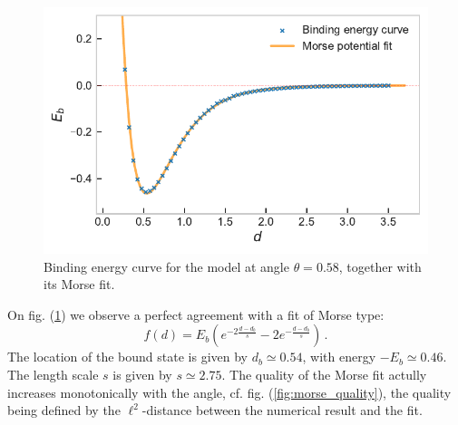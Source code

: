 \documentclass[reprint, amsmath, amssymb, aps, pra]{revtex4-2}
\begin{document}
    \begin{figure}
        \includegraphics[scale=0.74]{figures/binding.pdf}
        \caption{\label{fig:binding}Binding energy curve for the model at angle $\theta=0.58$, together with its Morse fit.}
    \end{figure}

    On fig. (\ref{fig:binding}) we observe a perfect agreement with a fit of Morse type:
    \begin{equation}
    \label{eq:morse_fit}
        f(d) = E_b\left(e^{-2\frac{d-d_b}{s}} - 2e^{-\frac{d-d_b}{s}}\right)\,.
    \end{equation}
    The location of the bound state is given by $d_b\simeq 0.54$, with energy $-E_b\simeq 0.46$. The length scale $s$ is given by $s\simeq 2.75$. The quality of the Morse fit actully increases monotonically with the angle, cf. fig. (\ref{fig:morse_quality}), the quality being defined by the $\ell^2$-distance between the numerical result and the fit.
\end{document}
